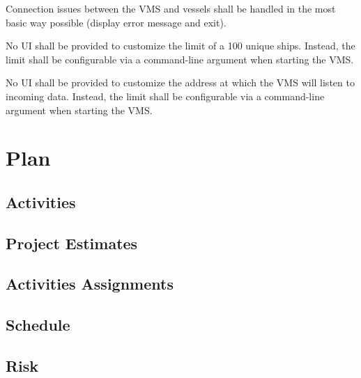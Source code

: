 \documentclass{article}
\begin{document}
Connection issues between the VMS and vessels shall be handled in the most basic way possible (display error message and exit).

No UI shall be provided to customize the limit of a 100 unique ships. Instead, the limit shall be configurable via a command-line argument when starting the VMS. 

No UI shall be provided to customize the address at which the VMS will listen to incoming data. Instead, the limit shall be configurable via a command-line argument when starting the VMS.

\section{Plan} %

\subsection{Activities}

\subsection{Project Estimates}

\subsection{Activities Assignments}

\subsection{Schedule}

\subsection{Risk}
\end{document}
